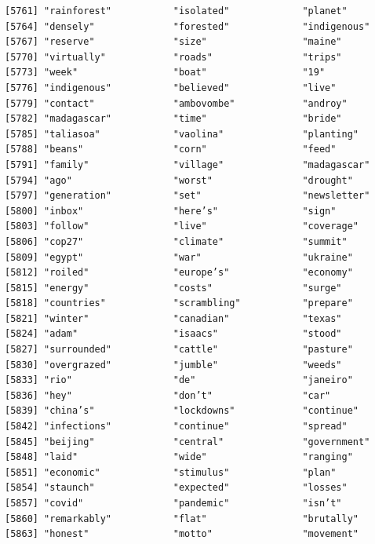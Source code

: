 \documentclass[
  letterpaper,
  DIV=11,
  numbers=noendperiod]{scrartcl}
\begin{document}
\begin{verbatim}
[5761] "rainforest"           "isolated"             "planet"              
[5764] "densely"              "forested"             "indigenous"          
[5767] "reserve"              "size"                 "maine"               
[5770] "virtually"            "roads"                "trips"               
[5773] "week"                 "boat"                 "19"                  
[5776] "indigenous"           "believed"             "live"                
[5779] "contact"              "ambovombe"            "androy"              
[5782] "madagascar"           "time"                 "bride"               
[5785] "taliasoa"             "vaolina"              "planting"            
[5788] "beans"                "corn"                 "feed"                
[5791] "family"               "village"              "madagascar"          
[5794] "ago"                  "worst"                "drought"             
[5797] "generation"           "set"                  "newsletter"          
[5800] "inbox"                "here’s"               "sign"                
[5803] "follow"               "live"                 "coverage"            
[5806] "cop27"                "climate"              "summit"              
[5809] "egypt"                "war"                  "ukraine"             
[5812] "roiled"               "europe’s"             "economy"             
[5815] "energy"               "costs"                "surge"               
[5818] "countries"            "scrambling"           "prepare"             
[5821] "winter"               "canadian"             "texas"               
[5824] "adam"                 "isaacs"               "stood"               
[5827] "surrounded"           "cattle"               "pasture"             
[5830] "overgrazed"           "jumble"               "weeds"               
[5833] "rio"                  "de"                   "janeiro"             
[5836] "hey"                  "don’t"                "car"                 
[5839] "china’s"              "lockdowns"            "continue"            
[5842] "infections"           "continue"             "spread"              
[5845] "beijing"              "central"              "government"          
[5848] "laid"                 "wide"                 "ranging"             
[5851] "economic"             "stimulus"             "plan"                
[5854] "staunch"              "expected"             "losses"              
[5857] "covid"                "pandemic"             "isn’t"               
[5860] "remarkably"           "flat"                 "brutally"            
[5863] "honest"               "motto"                "movement"            

\end{verbatim}
\end{document}
